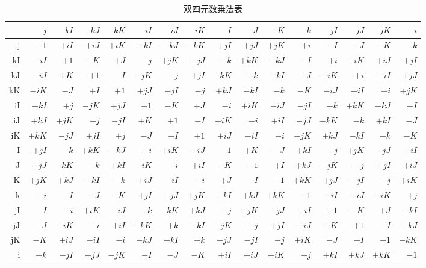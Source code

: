 \documentclass[a4paper]{article}
\begin{document}
\begin{table}[ht]
  \begin{center}
    \caption{双四元数乗法表}
    \small
    \begin{tabular}{r|rrrrrrrrrrrrrrr}
      &$j$&$kI$&$kJ$&$kK$&$iI$&$iJ$&$iK$&$I$&$J$&$K$&$k$&$jI$&$jJ$&$jK$&$i$ \\ \hline
      j&$-1$&$+iI$&$+iJ$&$+iK$&$-kI$&$-kJ$&$-kK$&$+jI$&$+jJ$&$+jK$&$+i$&$-I$&$-J$&$-K$&$-k$ \\ \hline
      kI&$-iI$&$+1$&$-K$&$+J$&$-j$&$+jK$&$-jJ$&$-k$&$+kK$&$-kJ$&$-I$&$+i$&$-iK$&$+iJ$&$+jI$ \\ \hline
      kJ&$-iJ$&$+K$&$+1$&$-I$&$-jK$&$-j$&$+jI$&$-kK$&$-k$&$+kI$&$-J$&$+iK$&$+i$&$-iI$&$+jJ$ \\ \hline
      kK&$-iK$&$-J$&$+I$&$+1$&$+jJ$&$-jI$&$-j$&$+kJ$&$-kI$&$-k$&$-K$&$-iJ$&$+iI$&$+i$&$+jK$ \\ \hline
      iI&$+kI$&$+j$&$-jK$&$+jJ$&$+1$&$-K$&$+J$&$-i$&$+iK$&$-iJ$&$-jI$&$-k$&$+kK$&$-kJ$&$-I$ \\ \hline
      iJ&$+kJ$&$+jK$&$+j$&$-jI$&$+K$&$+1$&$-I$&$-iK$&$-i$&$+iI$&$-jJ$&$-kK$&$-k$&$+kI$&$-J$ \\ \hline
      iK&$+kK$&$-jJ$&$+jI$&$+j$&$-J$&$+I$&$+1$&$+iJ$&$-iI$&$-i$&$-jK$&$+kJ$&$-kI$&$-k$&$-K$ \\ \hline
      I&$+jI$&$-k$&$+kK$&$-kJ$&$-i$&$+iK$&$-iJ$&$-1$&$+K$&$-J$&$+kI$&$-j$&$+jK$&$-jJ$&$+iI$ \\ \hline
      J&$+jJ$&$-kK$&$-k$&$+kI$&$-iK$&$-i$&$+iI$&$-K$&$-1$&$+I$&$+kJ$&$-jK$&$-j$&$+jI$&$+iJ$ \\ \hline
      K&$+jK$&$+kJ$&$-kI$&$-k$&$+iJ$&$-iI$&$-i$&$+J$&$-I$&$-1$&$+kK$&$+jJ$&$-jI$&$-j$&$+iK$ \\ \hline
      k&$-i$&$-I$&$-J$&$-K$&$+jI$&$+jJ$&$+jK$&$+kI$&$+kJ$&$+kK$&$-1$&$-iI$&$-iJ$&$-iK$&$+j$ \\ \hline
      jI&$-I$&$-i$&$+iK$&$-iJ$&$+k$&$-kK$&$+kJ$&$-j$&$+jK$&$-jJ$&$+iI$&$+1$&$-K$&$+J$&$-kI$ \\ \hline
      jJ&$-J$&$-iK$&$-i$&$+iI$&$+kK$&$+k$&$-kI$&$-jK$&$-j$&$+jI$&$+iJ$&$+K$&$+1$&$-I$&$-kJ$ \\ \hline
      jK&$-K$&$+iJ$&$-iI$&$-i$&$-kJ$&$+kI$&$+k$&$+jJ$&$-jI$&$-j$&$+iK$&$-J$&$+I$&$+1$&$-kK$ \\ \hline
      i&$+k$&$-jI$&$-jJ$&$-jK$&$-I$&$-J$&$-K$&$+iI$&$+iJ$&$+iK$&$-j$&$+kI$&$+kJ$&$+kK$&$-1$ \\ \hline
    \end{tabular}
  \end{center}
\end{table}
\end{document}
